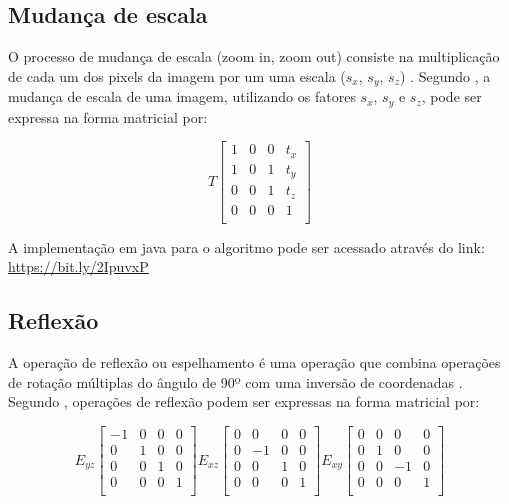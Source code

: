 \documentclass[
	12pt,				%
	oneside,			%
	a4paper,			%
	english,			%
	french,				%
	spanish,			%
	brazil,				%
	]{abntex2}
\begin{document}
\subsection{Mudança de escala}

O processo de mudança de escala (zoom in, zoom out) consiste na multiplicação de cada um dos pixels da imagem por um uma escala (\(s_x\), \(s_y\), \(s_z\))  \cite{conciAzevedoLeta:2008}. Segundo \citet{pedriniSchwartz:2008}, a mudança de escala de uma imagem, utilizando os fatores \(s_x\), \(s_y\) e \(s_z\), pode ser expressa na forma matricial por:

\[
T
\begin{bmatrix}
    1 & 0 & 0 & t_x   \\ 
	1 & 0 & 1 & t_y   \\ 
	0 & 0 & 1 & t_z   \\ 
	0 & 0 & 0 & 1     \\ 
\end{bmatrix} 
\]

A implementação em java para o algoritmo pode ser acessado através do link: \url{https://bit.ly/2IpuvxP}

\subsection{Reflexão}

A operação de reflexão ou espelhamento é uma operação que combina operações de rotação múltiplas do ângulo de 90º com uma inversão de coordenadas \cite{conciAzevedoLeta:2008}. Segundo \citet{pedriniSchwartz:2008}, operações de reflexão podem ser expressas na forma matricial por:

\[
E_{yz}
\begin{bmatrix}
    -1 & 0 & 0 & 0   \\ 
	 0 & 1 & 0 & 0   \\ 
	 0 & 0 & 1 & 0   \\ 
	 0 & 0 & 0 & 1   \\ 
\end{bmatrix} 
E_{xz}
\begin{bmatrix}
    0 &  0 & 0 & 0   \\ 
	0 & -1 & 0 & 0   \\ 
	0 &  0 & 1 & 0   \\ 
	0 &  0 & 0 & 1   \\ 
\end{bmatrix} 
E_{xy}
\begin{bmatrix}
    0 & 0 &  0 & 0   \\ 
	0 & 1 &  0 & 0   \\ 
	0 & 0 & -1 & 0   \\ 
	0 & 0 &  0 & 1   \\ 
\end{bmatrix} 
\]
\end{document}
